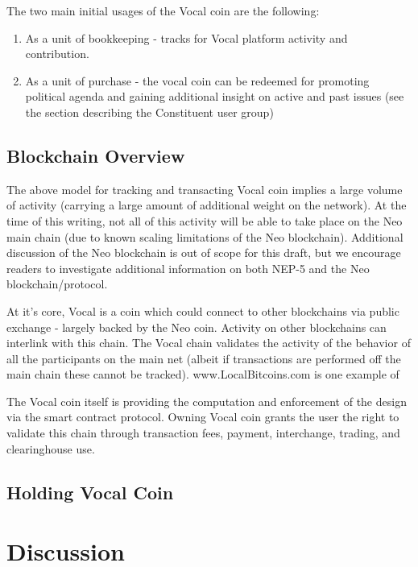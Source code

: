 \documentclass[conference]{IEEEtran}
\begin{document}
    The two main initial usages of the Vocal coin are the following:

    \begin{enumerate}
      \item As a unit of bookkeeping - tracks for Vocal platform activity and contribution.
      \item As a unit of purchase - the vocal coin can be redeemed for promoting political agenda and gaining additional insight on active and past issues (see the section describing the Constituent user group)
    \end{enumerate}

    \subsection{Blockchain Overview}

    The above model for tracking and transacting Vocal coin implies a large volume of activity (carrying a large amount of additional weight on the network). At the time of this writing, not all of this activity will be able to take place on the Neo main chain (due to known scaling limitations of the Neo blockchain). Additional discussion of the Neo blockchain is out of scope for this draft, but we encourage readers to investigate additional information on both NEP-5 and the Neo blockchain/protocol.

   At it's core, Vocal is a coin which could connect to other blockchains via public exchange - largely backed by the Neo coin. Activity on other blockchains can interlink with this chain. The Vocal chain validates the activity of the behavior of all the participants on the main net (albeit if transactions are performed off the main chain these cannot be tracked). www.LocalBitcoins.com is one example of

    The Vocal coin itself is providing the computation and enforcement of the design via the smart contract protocol. Owning Vocal coin grants the user the right to validate this chain through transaction fees, payment, interchange, trading, and clearinghouse use. 

    \subsection{Holding Vocal Coin}

    \section{Discussion}
\end{document}

